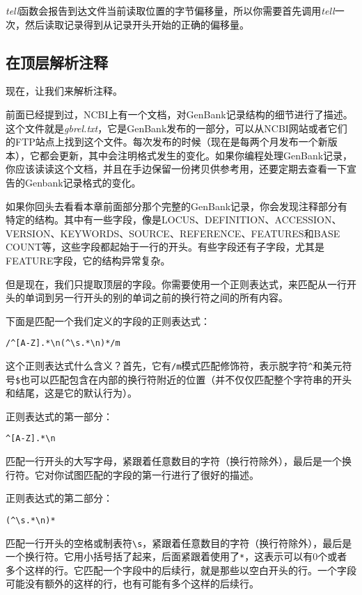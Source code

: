 \textit{tell}函数会报告到达文件当前读取位置的字节偏移量，所以你需要首先调用\textit{tell}一次，然后读取记录得到从记录开头开始的正确的偏移量。

\subsection{在顶层解析注释}
现在，让我们来解析注释。

前面已经提到过，NCBI上有一个文档，对GenBank记录结构的细节进行了描述。这个文件就是\textit{gbrel.txt}，它是GenBank发布的一部分，可以从NCBI网站或者它们的FTP站点上找到这个文件。每次发布的时候（现在是每两个月发布一个新版本），它都会更新，其中会注明格式发生的变化。如果你编程处理GenBank记录，你应该读读这个文档，并且在手边保留一份拷贝供参考用，还要定期去查看一下宣告的Genbank记录格式的变化。

如果你回头去看看本章前面部分那个完整的GenBank记录，你会发现注释部分有特定的结构。其中有一些字段，像是LOCUS、DEFINITION、ACCESSION、VERSION、KEYWORDS、SOURCE、REFERENCE、FEATURES和BASE COUNT等，这些字段都起始于一行的开头。有些字段还有子字段，尤其是FEATURE字段，它的结构异常复杂。

但是现在，我们只提取顶层的字段。你需要使用一个正则表达式，来匹配从一行开头的单词到另一行开头的别的单词之前的换行符之间的所有内容。

下面是匹配一个我们定义的字段的正则表达式：

\begin{lstlisting}
/^[A-Z].*\n(^\s.*\n)*/m
\end{lstlisting}

这个正则表达式什么含义？首先，它有\verb|/m|模式匹配修饰符，表示脱字符\verb|^|和美元符号\verb|$|也可以匹配包含在内部的换行符附近的位置（并不仅仅匹配整个字符串的开头和结尾，这是它的默认行为）。

正则表达式的第一部分：
  
\begin{lstlisting}
^[A-Z].*\n
\end{lstlisting}

匹配一行开头的大写字母，紧跟着任意数目的字符（换行符除外），最后是一个换行符。它对你试图匹配的字段的第一行进行了很好的描述。

正则表达式的第二部分：
  
\begin{lstlisting}
(^\s.*\n)*
\end{lstlisting}

匹配一行开头的空格或制表符\verb|\s|，紧跟着任意数目的字符（换行符除外），最后是一个换行符。它用小括号括了起来，后面紧跟着使用了\verb|*|，这表示可以有0个或者多个这样的行。它匹配一个字段中的后续行，就是那些以空白开头的行。一个字段可能没有额外的这样的行，也有可能有多个这样的后续行。


